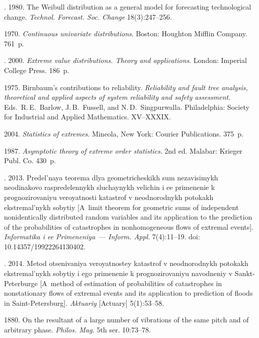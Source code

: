 \begin{multicols}{2}
{{\begin{thebibliography}{99}
. 1980.
The Weibull distribution as a general model for forecasting technological change.
\textit{Technol. Forecast. Soc. Change} 18(3):247--256.

 1970.
\textit{Continuous univariate distributions}.  Boston: Houghton Mifflin Company. 761~p.


. 2000. \textit{Extreme value distributions.
Theory and applications}. London: Imperial College Press.  186~p.


 1975. Birnbaum's contributions to reliability.
\textit{Reliability and fault tree analysis, theoretical and applied aspects of
system reliability and safety assessment}.
Eds.\ R.\,E.~Barlow, J.\,B.~Fussell, and N.\,D.~Singpurwalla.
Philadelphia: Society for Industrial and Applied Mathematics. XV--XXXIX.

 2004. \textit{Statistics of extremes}.
Mineola, New York: Courier Publications. 375~p.

 1987. \textit{Asymptotic theory of extreme order statistics}.
2nd ed. Malabar: Krieger Publ. Co. 430~p.

.
2013. Predel'naya teorema dlya geometricheskikh sum nezavisimykh neodinakovo
raspredelennykh sluchaynykh velichin i ee primenenie k prognozirovaniyu
ve\-ro\-yat\-nosti katastrof v neodnorodnykh potokakh ekstremal'nykh sobytiy
[A~limit theorem for geometric sums of independent nonidentically distributed
random variables and its application to the prediction of the probabilities
of catastrophes in nonhomogeneous flows of extremal events].
\textit{Informatika i ee Primeneniya}~--- \textit{Inform. Appl}. 7(4):11--19.
doi: 10.14357/19922264130402.

.
2014. Metod otsenivaniya veroyatnostey katastrof v neodnorodnykh potokakh
ekstremal'nykh sobytiy i ego primenenie k prognozirovaniyu navodneniy v
Sankt-Pe\-ter\-burge [A~method of estimation of probabilities of catastrophes
in nonstationary flows of extremal events and its application to prediction of
floods in Saint-Petersburg].  \textit{Aktuariy} [Actuary] 5(1):53--58.

 1880. On the resultant of a large number of
vibrations of the same pitch and of arbitrary phase.
\textit{Philos. Mag.} 5th ser. 10:73--78.


\end{thebibliography}}}
\end{multicols}
